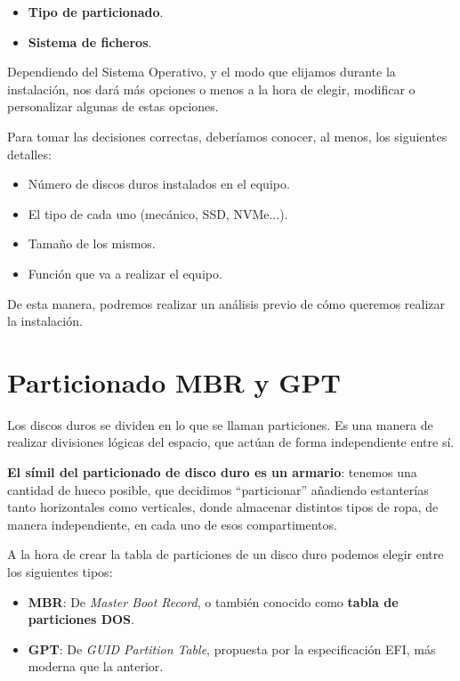 \begin{itemize}
    \item \textbf{Tipo de particionado}.
    \item \textbf{Sistema de ficheros}.
\end{itemize}

Dependiendo del Sistema Operativo, y el modo que elijamos durante la instalación, nos dará más opciones o menos a la hora de elegir, modificar o personalizar algunas de estas opciones.

Para tomar las decisiones correctas, deberíamos conocer, al menos, los siguientes detalles:

\begin{itemize}
    \item Número de discos duros instalados en el equipo.
    \item El tipo de cada uno (mecánico, SSD, NVMe...).
    \item Tamaño de los mismos.
    \item Función que va a realizar el equipo.
\end{itemize}

De esta manera, podremos realizar un análisis previo de cómo queremos realizar la instalación.


\section{Particionado MBR y GPT }
Los discos duros se dividen en lo que se llaman particiones. Es una manera de realizar divisiones lógicas del espacio, que actúan de forma independiente entre sí.

\textbf{El símil del particionado de disco duro es un armario}: tenemos una cantidad de hueco posible, que decidimos “particionar” añadiendo estanterías tanto horizontales como verticales, donde almacenar distintos tipos de ropa, de manera independiente, en cada uno de esos compartimentos.

A la hora de crear la tabla de particiones de un disco duro podemos elegir entre los siguientes tipos:

\begin{itemize}
    \item \textbf{MBR}: De \textit{Master Boot Record}, o también conocido como \textbf{tabla de particiones DOS}.
    \item \textbf{GPT}: De \textit{GUID Partition Table}, propuesta por la especificación EFI, más moderna que la anterior.
\end{itemize}

